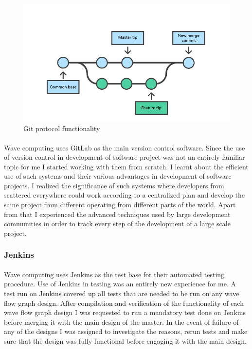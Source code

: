 \begin{figure}[H]
    \centering  
    \includegraphics[trim=0cm 0cm 0cm 0cm, clip=true,scale=0.7]{figures/git.png}
    \caption{Git protocol functionality\label{Fig:gitprot}}\vspace{-4mm}
    \end{figure}

\paragraph{}
Wave computing uses GitLab as the main version control software. Since the use of version control in development of software project was not an entirely familiar topic for me I started working with them from scratch. I learnt about the efficient use of such systems and their various advantages in development of software projects. I realized the significance of such systems where developers from scattered everywhere could work according to a centralized plan and develop the same project from different operating from different parts of the world. Apart from that I experienced the advanced techniques used by large development communities in order to track every step of the development of a large scale project. 

\subsubsection{Jenkins}
\paragraph{}
Wave computing uses Jenkins as the test base for their automated testing procedure. Use of Jenkins in testing was an entirely new experience for me. A test run on Jenkins covered up all tests that are needed to be run on any wave flow graph design. After compilation and verification of the functionality of each wave flow graph design I was requested to run a mandatory test done on Jenkins before merging it with the main design of the master. In the event of failure of any of the designs I was assigned to investigate the reasons, rerun tests and make sure that the design was fully functional before engaging it with the main design. 


